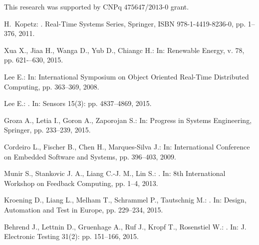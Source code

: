 \documentclass{acm_sen_article}
\begin{document}
This research was supported by CNPq $475647$/$2013$-$0$ grant.



\begin{thebibliography}{1}

H.~Kopetz:
.
\newblock Real-Time Systems Series, Springer, ISBN 978-1-4419-8236-0, pp. 1--376, 2011.

Xua X., Jiaa H., Wanga D., Yub D., Chiangc H.:
\newblock In: Renewable Energy, v. 78, pp. 621-–630, 2015.

Lee E.:
\newblock In: International Symposium on Object Oriented Real-Time Distributed Computing, pp. 363--369, 2008.

Lee E.:
. 
\newblock In: Sensors 15(3): pp. 4837--4869, 2015.

Groza A., Letia I., Goron A., Zaporojan S.: 
\newblock In: Progress in Systems Engineering, Springer, pp. 233--239, 2015.

Cordeiro L., Fischer B., Chen H., Marques-Silva J.:
\newblock In: International Conference on Embedded Software and Systems, pp. 396--403, 2009.


Munir  S., Stankovic J. A., Liang C.-J. M., Lin S.:
. 
\newblock In: 8th International Workshop on Feedback Computing, pp. 1--4, 2013.

Kroening D., Liang L., Melham T., Schrammel P., Tautschnig M.:
. 
\newblock In: Design, Automation and Test in Europe, pp. 229--234, 2015.

Behrend J., Lettnin D., Gruenhage A., Ruf J., Kropf T., Rosenstiel W.:
. 
\newblock In: J. Electronic Testing 31(2): pp. 151--166, 2015.


\end{thebibliography}
\end{document}
